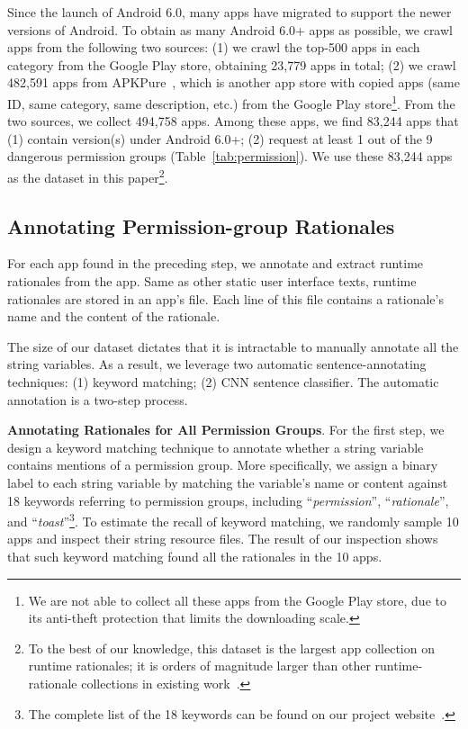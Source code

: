 Since the launch of Android 6.0, many apps have migrated to support the newer versions of Android. 
To obtain as many Android 6.0+ apps as possible, we crawl apps from the following two sources: 
(1) we crawl the top-500 apps in each category from the Google Play store, obtaining 23,779 apps in total; 
(2) we crawl 482,591 apps from APKPure~\cite{apkpure}, which is another app store with copied apps (same ID, same category, same description, etc.) from the Google Play store\footnote{We are not able to collect all these apps from the Google Play store, due to its anti-theft protection that limits the downloading scale.}. 
From the two sources, we collect 494,758 apps. Among these apps, we find 83,244 apps that 
(1) contain version(s) under Android 6.0+; 
(2) request at least 1 out of the 9 dangerous permission groups (Table~\ref{tab:permission}). 
We use these 83,244 apps as the dataset in this paper\footnote{To the best of our knowledge, this dataset is the largest app collection on runtime rationales; 
it is orders of magnitude larger than other runtime-rationale collections in existing work~\cite{Micinski2017UserIA,conf/chi/TanNTNTEW14}.}. 

\subsection{Annotating Permission-group Rationales}

For each app found in the preceding step, we annotate and extract runtime rationales from the app. 
Same as other static user interface texts, runtime rationales are stored in an app's  file. 
Each line of this file contains a rationale's name and the content of the rationale. 

The size of our dataset dictates that it is intractable to manually annotate all the string variables. 
As a result, we leverage two automatic sentence-annotating techniques: 
(1) keyword matching; 
(2) CNN sentence classifier. 
The automatic annotation is a two-step process. 

\textbf{Annotating Rationales for All Permission Groups}. 
For the first step, we design a keyword matching technique to annotate whether a string variable contains mentions of a permission group. 
More specifically, we assign a binary label to each string variable by matching the variable's name or content against 18 keywords referring to permission groups, including ``\emph{permission}'', ``\emph{rationale}'', and ``\emph{toast}''\footnote{The complete list of the 18 keywords can be found on our project website~\cite{runtimeproj}.}. 
To estimate the recall of keyword matching, we randomly sample 10 apps and inspect their string resource files. 
The result of our inspection shows that such keyword matching found all the rationales in the 10 apps. 

